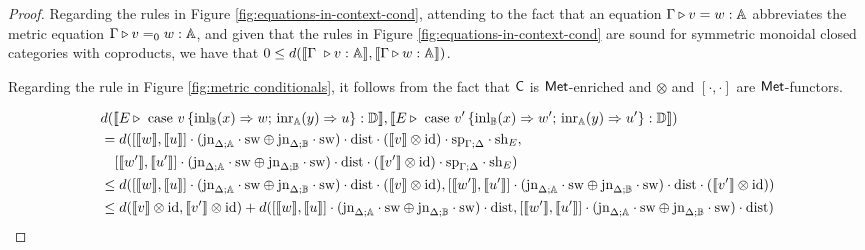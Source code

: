 \documentclass[10pt,a4paper]{amsart}
\theoremstyle{definition}
\theoremstyle{definition}
\theoremstyle{definition}
\theoremstyle{definition}
\theoremstyle{definition}
\theoremstyle{definition}
\begin{document}
\begin{proof}
  Regarding the rules in Figure \ref{fig:equations-in-context-cond}, attending to the fact that an equation $\Gamma \triangleright v=w: \mathbb{A}$ abbreviates the metric equation $\Gamma \triangleright v =_0 w: \mathbb{A}$, and given that the rules in Figure \ref{fig:equations-in-context-cond} are sound for symmetric monoidal closed categories with coproducts, we have that $0 \leq d( \llbracket \Gamma  \vljud v : \typeA \rrbracket, \llbracket\Gamma \vljud w : \typeA \rrbracket)$.  

 Regarding the rule in Figure \ref{fig:metric conditionals}, it follows from the fact that $\mathsf{C}$ is  $\mathsf{Met}$-enriched and $\otimes$ and $[ \cdot , \cdot ]$ are $\mathsf{Met}$-functors.

  \begin{align*}
    & d( \llbracket E  \vljud \text{ case } v \, \{\text{inl}_{\typeB}  (x) \Rightarrow w ; \, \text{inr}_{\typeA} (y) \Rightarrow u\} : \typeD \rrbracket, \llbracket E \vljud \text{ case } v' \, \{\text{inl}_{\typeB}  (x) \Rightarrow w' ; \, \text{inr}_{\typeA} (y) \Rightarrow u'\} : \typeD \rrbracket)  \\
    & = d( [\llbracket w\rrbracket ,\llbracket u\rrbracket] \comp (\text{jn}_{\Delta;\typeA}\comp \sw \oplus \text{jn}_{\Delta;\typeB}\comp \sw) \comp \dist \comp (\llbracket v\rrbracket \otimes \text{id}) \comp \text{sp}_{\Gamma;\Delta} \comp \text{sh}_{E}, \\
    & \hspace{10pt} [\llbracket w'\rrbracket ,\llbracket u'\rrbracket] \comp (\text{jn}_{\Delta;\typeA}\comp \sw \oplus \text{jn}_{\Delta;\typeB}\comp \sw) \comp \dist \comp (\llbracket v'\rrbracket \otimes \text{id}) \comp \text{sp}_{\Gamma;\Delta} \comp \text{sh}_{E})\\
    & \leq d( [\llbracket w\rrbracket ,\llbracket u\rrbracket] \comp (\text{jn}_{\Delta;\typeA}\comp \sw \oplus \text{jn}_{\Delta;\typeB}\comp \sw) \comp \dist \comp (\llbracket v\rrbracket \otimes \text{id}),  [\llbracket w'\rrbracket ,\llbracket u'\rrbracket] \comp (\text{jn}_{\Delta;\typeA}\comp \sw \oplus \text{jn}_{\Delta;\typeB}\comp \sw) \comp \dist \comp (\llbracket v'\rrbracket \otimes \text{id}) )\\
    & \leq d(\llbracket v\rrbracket \otimes \text{id}, \llbracket v'\rrbracket \otimes \text{id}) +  d( [\llbracket w\rrbracket ,\llbracket u\rrbracket] \comp (\text{jn}_{\Delta;\typeA}\comp \sw \oplus \text{jn}_{\Delta;\typeB}\comp \sw) \comp \dist,  [\llbracket w'\rrbracket ,\llbracket u'\rrbracket] \comp (\text{jn}_{\Delta;\typeA}\comp \sw \oplus \text{jn}_{\Delta;\typeB}\comp \sw) \comp \dist) \\

\end{align*}
\end{proof}
\end{document}
